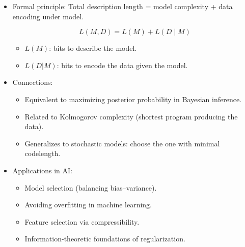 \documentclass[
  letterpaper,
  DIV=11,
  numbers=noendperiod]{scrreprt}
\providecommand{\tightlist}{%
  \setlength{\itemsep}{0pt}\setlength{\parskip}{0pt}}
\begin{document}
\begin{itemize}
\item
  Formal principle: Total description length = model complexity + data
  encoding under model.

  \[
  L(M, D) = L(M) + L(D \mid M)
  \]

  \begin{itemize}
  \tightlist
  \item
    \(L(M)\): bits to describe the model.
  \item
    \(L(D|M)\): bits to encode the data given the model.
  \end{itemize}
\item
  Connections:

  \begin{itemize}
  \tightlist
  \item
    Equivalent to maximizing posterior probability in Bayesian
    inference.
  \item
    Related to Kolmogorov complexity (shortest program producing the
    data).
  \item
    Generalizes to stochastic models: choose the one with minimal
    codelength.
  \end{itemize}
\item
  Applications in AI:

  \begin{itemize}
  \tightlist
  \item
    Model selection (balancing bias--variance).
  \item
    Avoiding overfitting in machine learning.
  \item
    Feature selection via compressibility.
  \item
    Information-theoretic foundations of regularization.
  \end{itemize}
\end{itemize}
\end{document}
